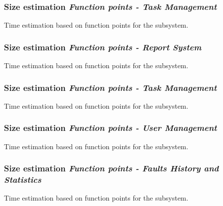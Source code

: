 
\begin{frame}
\frametitle{Size estimation \hfill \emph{Function points - Task Management}}
\begin{table}[hbtp]
\centering

\caption{Time estimation based on function points for the subsystem.}
\label{tblFunctionPointsSize}
\end{table}
\end{frame}


\begin{frame}
\frametitle{Size estimation \hfill \emph{Function points - Report System}}
\begin{table}[hbtp]
\centering

\caption{Time estimation based on function points for the subsystem.}
\label{tblFunctionPointsSize}
\end{table}
\end{frame}


\begin{frame}
\frametitle{Size estimation \hfill \emph{Function points - Task Management}}
\begin{table}[hbtp]
\centering

\caption{Time estimation based on function points for the subsystem.}
\label{tblFunctionPointsSize}
\end{table}
\end{frame}


\begin{frame}
\frametitle{Size estimation \hfill \emph{Function points - User Management}}
\begin{table}[hbtp]
\centering

\caption{Time estimation based on function points for the subsystem.}
\label{tblFunctionPointsSize}
\end{table}
\end{frame}


\begin{frame}
\frametitle{Size estimation \hfill \emph{Function points - Faults History and Statistics}}
\begin{table}[hbtp]
\centering

\caption{Time estimation based on function points for the subsystem.}
\label{tblFunctionPointsSize}
\end{table}
\end{frame}
